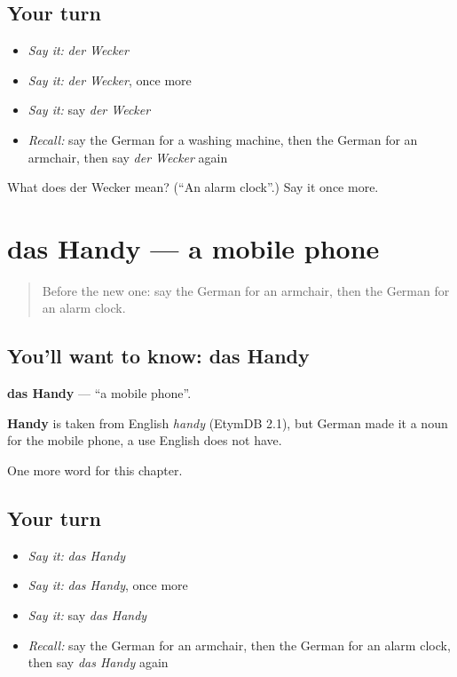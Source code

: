 \subsection*{Your turn}
\begin{itemize}
\raggedright
  \item \emph{Say it:} \emph{der Wecker}
  \item \emph{Say it:} \emph{der Wecker}, once more
  \item \emph{Say it:} say \emph{der Wecker}
  \item \emph{Recall:} say the German for a washing machine, then the German for an armchair, then say \emph{der Wecker} again
\end{itemize}

\begin{tcolorbox}[breakable,colback=teal!4,colframe=teal!35!black,title={Before you move on}]
What does der Wecker mean? (\textquotedblleft{}An alarm clock\textquotedblright{}.) Say it once more.
\end{tcolorbox}
\section[das Handy]{das Handy — a mobile phone}

\label{lesson:GE-C116-handy}



\begin{quote}
Before the new one: say the German for an armchair, then the German for an alarm clock.
\end{quote}

\subsection*{You'll want to know: das Handy}
\textbf{das Handy} — \textquotedblleft{}a mobile phone\textquotedblright{}.

\begin{cousinweb}
\textbf{Handy} is taken from English \emph{handy} (EtymDB 2.1), but German made it a noun for the mobile phone, a use English does not have.
\end{cousinweb}

\begin{grammarlens}[title={What you've built}]
One more word for this chapter.
\end{grammarlens}

\subsection*{Your turn}
\begin{itemize}
\raggedright
  \item \emph{Say it:} \emph{das Handy}
  \item \emph{Say it:} \emph{das Handy}, once more
  \item \emph{Say it:} say \emph{das Handy}
  \item \emph{Recall:} say the German for an armchair, then the German for an alarm clock, then say \emph{das Handy} again
\end{itemize}

